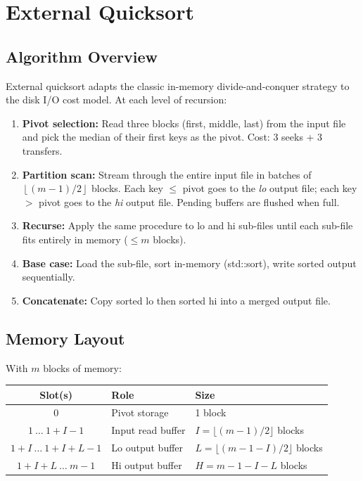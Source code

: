 \documentclass[12pt,a4paper]{article}
\newcommand{\floor}[1]{\left\lfloor #1 \right\rfloor}
\begin{document}
\section{External Quicksort}

\subsection{Algorithm Overview}

External quicksort adapts the classic in-memory divide-and-conquer strategy to
the disk I/O cost model. At each level of recursion:
\begin{enumerate}[noitemsep]
  \item \textbf{Pivot selection:} Read three blocks (first, middle, last) from
    the input file and pick the median of their first keys as the pivot.
    Cost: 3 seeks + 3 transfers.
  \item \textbf{Partition scan:} Stream through the entire input file in batches
    of $\floor{(m-1)/2}$ blocks. Each key $\le$ pivot goes to the \emph{lo}
    output file; each key $>$ pivot goes to the \emph{hi} output file.
    Pending buffers are flushed when full.
  \item \textbf{Recurse:} Apply the same procedure to lo and hi sub-files
    until each sub-file fits entirely in memory ($\le m$ blocks).
  \item \textbf{Base case:} Load the sub-file, sort in-memory
    (std::sort), write sorted output sequentially.
  \item \textbf{Concatenate:} Copy sorted lo then sorted hi into a merged
    output file.
\end{enumerate}

\subsection{Memory Layout}

With $m$ blocks of memory:

\begin{center}
\begin{tabular}{cll}
\toprule
\textbf{Slot(s)} & \textbf{Role} & \textbf{Size} \\
\midrule
0 & Pivot storage & 1 block \\
$1\ \ldots\ 1+I-1$ & Input read buffer & $I = \lfloor(m-1)/2\rfloor$ blocks \\
$1+I\ \ldots\ 1+I+L-1$ & Lo output buffer & $L = \lfloor(m-1-I)/2\rfloor$ blocks \\
$1+I+L\ \ldots\ m-1$ & Hi output buffer & $H = m-1-I-L$ blocks \\
\bottomrule
\end{tabular}
\end{center}
\end{document}
